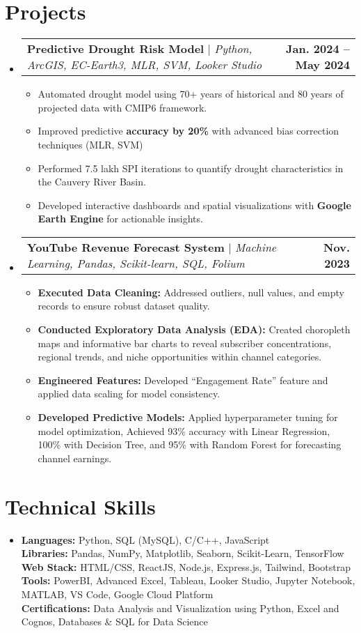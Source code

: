 \documentclass[letterpaper,11pt]{article}
\makeatletter
\newcommand{\resumeProjectHeading}[2]{
    \item
    \begin{tabular*}{0.97\textwidth}{l@{\extracolsep{\fill}}r}
      \small#1 & \textbf{\small#2} \\
    \end{tabular*}\vspace{-7pt}
}
\newcommand{\resumeItem}[1]{
  \item\small{
    {#1 \vspace{-2pt}}
  }
}
\newcommand{\resumeSubHeadingListStart}{\begin{itemize}[leftmargin=0.15in, label={}]}
\newcommand{\resumeSubHeadingListEnd}{\end{itemize}}
\newcommand{\resumeItemListStart}{\begin{itemize}}
\newcommand{\resumeItemListEnd}{\end{itemize}\vspace{-5pt}}
\makeatother
\begin{document}
\section{Projects}
    \resumeSubHeadingListStart
      \resumeProjectHeading
          {\textbf{Predictive Drought Risk Model} $|$ \emph{Python, ArcGIS, EC-Earth3, MLR, SVM, Looker Studio}}{Jan. 2024 -- May 2024}
          \resumeItemListStart
            \resumeItem{Automated drought model using 70+ years of historical and 80 years of projected data with CMIP6 framework.}
            \resumeItem{Improved predictive \textbf{accuracy by 20\%} with advanced bias correction techniques (MLR, SVM)}
            \resumeItem{Performed 7.5 lakh SPI iterations to quantify drought characteristics in the Cauvery River Basin.}
            \resumeItem{Developed interactive dashboards and spatial visualizations with \textbf{Google Earth Engine} for actionable insights.}
          \resumeItemListEnd
          
      \resumeProjectHeading
          {\textbf{YouTube Revenue Forecast System} $|$ \emph{Machine Learning, Pandas, Scikit-learn, SQL, Folium}}{Nov. 2023}
          \resumeItemListStart
            \resumeItem{\textbf{Executed Data Cleaning:} Addressed outliers, null values, and empty records to ensure robust dataset quality.}
            \resumeItem{\textbf{Conducted Exploratory Data Analysis (EDA):} Created choropleth maps and informative bar charts to reveal subscriber concentrations, regional trends, and niche opportunities within channel categories.}
            \resumeItem{\textbf{Engineered Features:} Developed “Engagement Rate” feature and applied data scaling for model consistency.}
            \resumeItem{\textbf{Developed Predictive Models:} Applied hyperparameter tuning for model optimization, Achieved 93\% accuracy with Linear Regression, 100\% with Decision Tree, and 95\% with Random Forest for forecasting channel earnings.}
          \resumeItemListEnd
    \resumeSubHeadingListEnd


\section{Technical Skills}
 \begin{itemize}[leftmargin=0.15in, label={}]
    \small \item{
         \textbf{Languages:}{ Python, SQL (MySQL), C/C++, JavaScript} \\
         \textbf{Libraries:}{ Pandas, NumPy, Matplotlib, Seaborn, Scikit-Learn, TensorFlow} \\
         \textbf{Web Stack:}{ HTML/CSS, ReactJS, Node.js, Express.js, Tailwind, Bootstrap} \\
         \textbf{Tools:}{ PowerBI, Advanced Excel, Tableau, Looker Studio, Jupyter Notebook, MATLAB, VS Code, Google Cloud Platform} \\
         \textbf{Certifications:}{ Data Analysis and Visualization using Python, Excel and Cognos, Databases \& SQL for Data Science}
    } \vspace{-5pt}
 \end{itemize} \vspace{-5pt}
\end{document}
